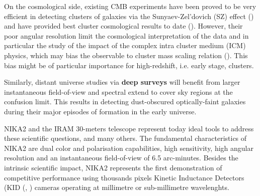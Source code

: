 \documentclass[]{aa} %
\begin{document}
On the cosmological side, existing CMB experiments have been proved to be very efficient in detecting clusters of galaxies via the Sunyaev-Zel\textquoteright dovich (SZ) effect (\cite{plancksz2,actsz,sptsz}) and have provided best cluster cosmological results to date (\cite{plancksp2,plancknc2}). However, their poor angular resolution limit the cosmological interpretation of the data and in particular the study of the impact of the complex intra cluster medium (ICM) physics, which may bias the observable to cluster mass scaling relation (\cite{plancknc2}). This bias might be of particular importance for high-redshift, i.e. early stage, clusters. 

Similarly, distant universe studies via \textbf{deep surveys} will benefit from larger instantaneous field-of-view and spectral extend to cover sky regions at the confusion limit. This results in detecting dust-obscured optically-faint galaxies during their major episodes of formation in the early universe. 

NIKA2 and the IRAM 30-meters telescope represent today ideal tools to address these scientific questions, and many others. The fundamental characteristics of NIKA2 are dual color and polarisation capabilities, high sensitivity, high angular resolution and an instantaneous field-of-view of 6.5 arc-minutes. Besides the intrinsic scientific impact, NIKA2 represents the first demonstration of competitive performance using thousands pixels Kinetic Inductance Detectors (KID (\cite{Day2003}, \cite{Doyle2010}) cameras operating at millimetre or sub-millimetre wavelenghts.

\end{document}
